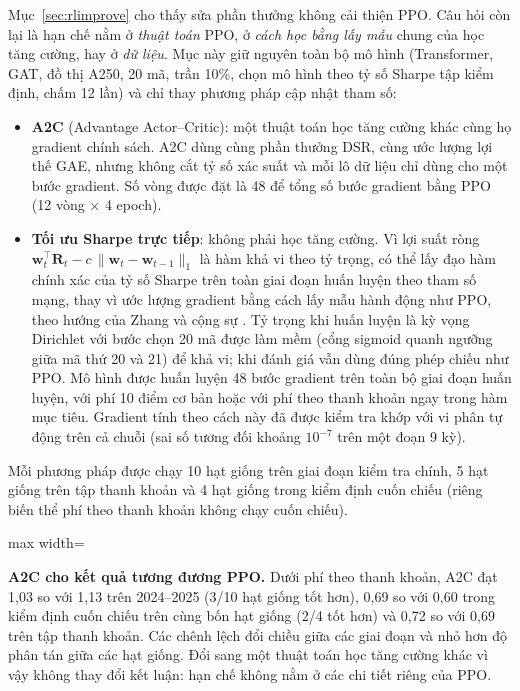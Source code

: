 Mục~\ref{sec:rlimprove} cho thấy sửa phần thưởng không cải thiện PPO. Câu hỏi còn lại là hạn chế nằm ở \emph{thuật toán} PPO, ở \emph{cách học bằng lấy mẫu} chung của học tăng cường, hay ở \emph{dữ liệu}. Mục này giữ nguyên toàn bộ mô hình (Transformer, GAT, đồ thị A250, 20 mã, trần 10\%, chọn mô hình theo tỷ số Sharpe tập kiểm định, chấm 12 lần) và chỉ thay phương pháp cập nhật tham số:
\begin{itemize}
  \item \textbf{A2C} (Advantage Actor--Critic): một thuật toán học tăng cường khác cùng họ gradient chính sách. A2C dùng cùng phần thưởng DSR, cùng ước lượng lợi thế GAE, nhưng không cắt tỷ số xác suất và mỗi lô dữ liệu chỉ dùng cho một bước gradient. Số vòng được đặt là 48 để tổng số bước gradient bằng PPO (12 vòng $\times$ 4 epoch).
  \item \textbf{Tối ưu Sharpe trực tiếp}: không phải học tăng cường. Vì lợi suất ròng $\mathbf{w}_t^{\top}\mathbf{R}_t - c\,\lVert\mathbf{w}_t-\mathbf{w}_{t-1}\rVert_1$ là hàm khả vi theo tỷ trọng, có thể lấy đạo hàm chính xác của tỷ số Sharpe trên toàn giai đoạn huấn luyện theo tham số mạng, thay vì ước lượng gradient bằng cách lấy mẫu hành động như PPO, theo hướng của Zhang và cộng sự \cite{zhang2020}. Tỷ trọng khi huấn luyện là kỳ vọng Dirichlet với bước chọn 20 mã được làm mềm (cổng sigmoid quanh ngưỡng giữa mã thứ 20 và 21) để khả vi; khi đánh giá vẫn dùng đúng phép chiếu như PPO. Mô hình được huấn luyện 48 bước gradient trên toàn bộ giai đoạn huấn luyện, với phí 10 điểm cơ bản hoặc với phí theo thanh khoản ngay trong hàm mục tiêu. Gradient tính theo cách này đã được kiểm tra khớp với vi phân tự động trên cả chuỗi (sai số tương đối khoảng $10^{-7}$ trên một đoạn 9 kỳ).
\end{itemize}
Mỗi phương pháp được chạy 10 hạt giống trên giai đoạn kiểm tra chính, 5 hạt giống trên tập thanh khoản và 4 hạt giống trong kiểm định cuốn chiếu (riêng biến thể phí theo thanh khoản không chạy cuốn chiếu).

\begin{table}[ht]
\centering\footnotesize
\setlength{\tabcolsep}{3pt}
\caption{Tỷ số Sharpe (trung bình $\pm$ độ lệch chuẩn qua các hạt giống) khi thay PPO bằng A2C hoặc tối ưu Sharpe trực tiếp, ở phí 10 điểm cơ bản và phí theo thanh khoản (TK)}
\label{tab:v4}
\begin{adjustbox}{max width=\textwidth}\end{adjustbox}
\end{table}

\textbf{A2C cho kết quả tương đương PPO.} Dưới phí theo thanh khoản, A2C đạt 1,03 so với 1,13 trên 2024--2025 (3/10 hạt giống tốt hơn), 0,69 so với 0,60 trong kiểm định cuốn chiếu trên cùng bốn hạt giống (2/4 tốt hơn) và 0,72 so với 0,69 trên tập thanh khoản. Các chênh lệch đổi chiều giữa các giai đoạn và nhỏ hơn độ phân tán giữa các hạt giống. Đổi sang một thuật toán học tăng cường khác vì vậy không thay đổi kết luận: hạn chế không nằm ở các chi tiết riêng của PPO.

